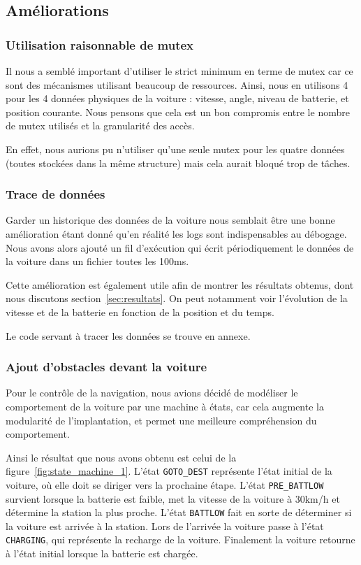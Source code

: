 \documentclass[conference]{IEEEtran}
\begin{document}
\subsection{Améliorations}

\subsubsection{Utilisation raisonnable de mutex}

Il nous a semblé important d'utiliser le strict minimum en terme de mutex car ce sont des mécanismes utilisant beaucoup de ressources. Ainsi, nous en utilisons 4 pour les 4 données physiques de la voiture : vitesse, angle, niveau de batterie, et position courante. Nous pensons que cela est un bon compromis entre le nombre de mutex utilisés et la granularité des accès. 

En effet, nous aurions pu n'utiliser qu'une seule mutex pour les quatre données (toutes stockées dans la même structure) mais cela aurait bloqué trop de tâches.

\subsubsection{Trace de données}

Garder un historique des données de la voiture nous semblait être une bonne amélioration étant donné qu'en réalité les logs sont indispensables au débogage. Nous avons alors ajouté un fil d'exécution qui écrit périodiquement le données de la voiture dans un fichier toutes les 100ms.

Cette amélioration est également utile afin de montrer les résultats obtenus, dont nous discutons section~\ref{sec:resultats}. On peut notamment voir l'évolution de la vitesse et de la batterie en fonction de la position et du temps.

Le code servant à tracer les données se trouve en annexe.

\subsubsection{Ajout d'obstacles devant la voiture}

Pour le contrôle de la navigation, nous avions décidé de modéliser le comportement de la voiture par une machine à états, car cela augmente la modularité de l'implantation, et permet une meilleure compréhension du comportement.

Ainsi le résultat que nous avons obtenu est celui de la figure~\ref{fig:state_machine_1}. 
L'état \texttt{GOTO\_DEST} représente l'état initial de la voiture, où elle doit se diriger vers la prochaine étape. L'état \texttt{PRE\_BATTLOW} survient lorsque la batterie est faible, met la vitesse de la voiture à 30km/h et détermine la station la plus proche. L'état \texttt{BATTLOW} fait en sorte de déterminer si la voiture est arrivée à la station. Lors de l'arrivée la voiture passe à l'état \texttt{CHARGING}, qui représente la recharge de la voiture. Finalement la voiture retourne à l'état initial lorsque la batterie est chargée.
\end{document}
